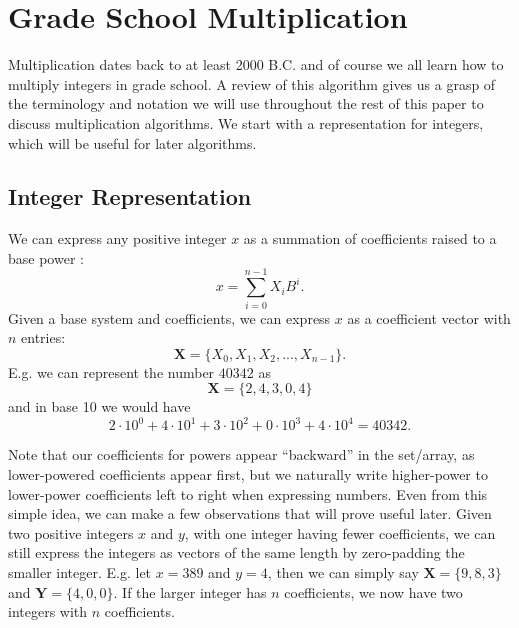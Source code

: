 \documentclass[psamsfonts,reqno]{amsart}
\theoremstyle{definition}
\theoremstyle{remark}
\numberwithin{equation}{section}
\begin{document}
\section{Grade School Multiplication}
Multiplication dates back to at least 2000 B.C. \cite{burton1985history} and of course we all learn how to multiply integers in grade school. A review of this algorithm gives us a grasp of the terminology and notation we will use throughout the rest of this paper to discuss multiplication algorithms. We start with a representation for integers, which will be useful for later algorithms.

\subsection{Integer Representation \nopunct}

We can express any positive integer $x$ as a summation of coefficients raised to a base power \cite{silverman2014friendly}:
\begin{equation}
	x = \sum_{i=0}^{n-1} X_iB^i.
\end{equation}
Given a base system and coefficients, we can express $x$ as a coefficient vector with $n$ entries: 
\begin{equation}
	\mathbf{X}=\{X_0, X_1, X_2, ..., X_{n-1}\}.
\end{equation}
E.g. we can represent the number $40342$ as 
\begin{equation}
	\mathbf{X}=\{2, 4, 3, 0, 4\}
\end{equation}
and in base 10 we would have 
\begin{equation}
	2 \cdot 10^0 + 4 \cdot 10^1 + 3 \cdot 10^2 + 0 \cdot 10^3 + 4 \cdot 10^4 =40342.
\end{equation}

Note that our coefficients for powers appear ``backward'' in the set/array, as lower-powered coefficients appear first, but we naturally write higher-power to lower-power coefficients left to right when expressing numbers. Even from this simple idea, we can make a few observations that will prove useful later. Given two positive integers $x$ and $y$, with one integer having fewer coefficients, we can still express the integers as vectors of the same length by zero-padding the smaller integer. E.g. let $x=389$ and $y=4$, then we can simply say $\mathbf{X}=\{9, 8, 3\}$ and $\mathbf{Y}=\{4, 0, 0\}$. If the larger integer has $n$ coefficients, we now have two integers with $n$ coefficients.
\end{document}
